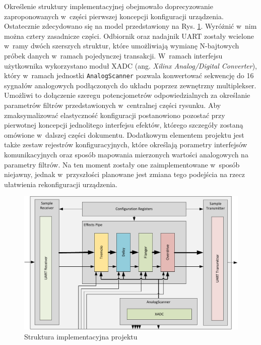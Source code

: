 Określenie struktury implementacyjnej obejmowało doprecyzowanie zaproponowanych w~części pierwszej koncepcji konfiguracji urządzenia. Ostatecznie zdecydowano się na model przedstawiony na Rys. \ref{fpga-structure}. Wyróżnić w~nim można cztery zasadnicze części. Odbiornik oraz nadajnik UART zostały wcielone w~ramy dwóch szerszych struktur, które umożliwiają wymianę N-bajtowych próbek danych w~ramach pojedynczej transakcji. W~ramach interfejsu użytkownika wykorzystano moduł XADC (ang. \textit{Xilinx Analog/Digital Converter}), który w~ramach jednostki \verb|AnalogScanner| pozwala konwertować sekwencję do 16 sygnałów analogowych podłączonych do układu poprzez zewnętrzny multiplekser. Umożliwi to dołączenie szeregu potencjometrów odpowiedzialnych za określanie parametrów filtrów przedstawionych w~centralnej części rysunku. Aby zmaksymalizować elastyczność konfiguracji postanowiono pozostać przy pierwotnej koncepcji jednolitego interfejsu efektów, którego szczegóły zostaną omówione w~dalszej części dokumentu. Dodatkowym elementem projektu jest także zestaw rejestrów konfiguracyjnych, które określają porametry interfejsów komunikacyjnych oraz sposób mapowania mierzonych wartości analogowych na parametry filtrów. Na ten moment zostały one zaimplementowane w~sposób niejawny, jednak w~przyszłości planowane jest zmiana tego podejścia na rzecz ułatwienia rekonfiguracji urządzenia.

\vspace{0.5cm}
\begin{figure}[ht]
    \centering
    \includegraphics[scale=0.75]{img/diagrams/project_diagram.pdf}
    \captionsetup{format=plain,justification=centering}
    \caption{Struktura implementacyjna projektu}
    \label{fpga-structure}
\end{figure}
\vspace{0.5cm}

